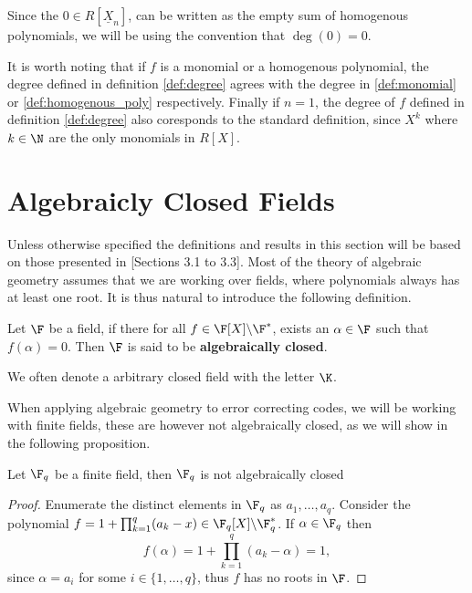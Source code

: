 \begin{remark}\label{rem:deg_0}
  Since the $0 \in R[\underline{X}_{n}]$, can be written as the empty sum of homogenous polynomials, we will be using the convention that $\deg(0) = 0$.
\end{remark}
It is worth noting that if $f$ is a monomial or a homogenous polynomial, the degree defined in definition \ref{def:degree} agrees with the degree in \ref{def:monomial} or \ref{def:homogenous_poly} respectively.
Finally if $n = 1$, the degree of $f$ defined in definition \ref{def:degree} also coresponds to the standard definition, since $X^{k}$ where $k \in \N$ are the only monomials in $R[X]$.

\section{Algebraicly Closed Fields}%
Unless otherwise specified the definitions and results in this section will be based on those presented in \citep{alg_notes}[Sections 3.1 to 3.3].
Most of the theory of algebraic geometry assumes that we are working over fields, where polynomials always has at least one root. It is thus natural to introduce the following definition.
\begin{definition}\label{def:alg_closed}
  Let $\F$ be a field, if there for all $f \in \F[X] \backslash \F^*$, exists an $\alpha \in \F$ such that $f(\alpha) = 0$. Then $\F$ is said to be \textbf{algebraically closed}.
\end{definition}
\begin{remark}
  We often denote a arbitrary closed field with the letter $\K$.
\end{remark}

When applying algebraic geometry to error correcting codes, we will be working with finite fields, these are however not algebraically closed, as we will show in the following proposition.
\begin{proposition}
  Let $\F_{q}$ be a finite field, then $\F_{q}$ is not algebraically closed
\end{proposition}
\begin{proof}
  Enumerate the distinct elements in $\F_{q}$ as $a_{1}, \ldots, a_{q}$. Consider the polynomial $f = 1 + \prod^{q}_{k = 1} (a_{k} - x) \in \F_{q}[X] \backslash \F_{q}^{*}$. If $\alpha \in \F_{q}$ then
  \begin{equation*}
    f(\alpha) = 1 + \prod^{q}_{k = 1} (a_{k} - \alpha) = 1,
  \end{equation*}
  since $\alpha = a_{i}$ for some $i \in \{1, \ldots, q\}$, thus $f$ has no roots in $\F$.
\end{proof}

